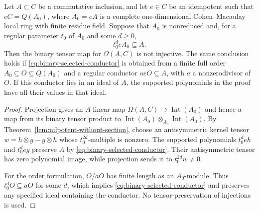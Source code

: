 \begin{lemma}
\label{lem:binary-selected-factor-transfer}
Let $A\subset C$ be a commutative inclusion, and let $e\in C$
be an idempotent such that $eC=Q(A_0)$, where $A_0=eA$ is a
complete one-dimensional Cohen--Macaulay local ring with finite
residue field.  Suppose that $A_0$ is nonreduced and, for a
regular parameter $t_0$ of $A_0$ and some $d\ge0$,
\begin{equation}\label{eq:binary-selected-conductor}
 t_0^deA_0\subseteq A.                                   
\end{equation}
Then the binary tensor map for $\Omega(A,C)$ is not injective.
The same conclusion holds if \eqref{eq:binary-selected-conductor} is obtained from a finite full
order $A_0\subseteq O\subseteq Q(A_0)$ and a regular conductor
$a eO\subseteq A$, with $a$ a nonzerodivisor of $O$.
If this conductor lies in an ideal of $A$, the supported
polynomials in the proof have all their values in that ideal.
\end{lemma}
\begin{proof}
Projection gives an $A$-linear map
$\Omega(A,C)\to\operatorname{Int}(A_0)$ and hence a map from its
binary tensor product to
$\operatorname{Int}(A_0)\otimes_{A_0}\operatorname{Int}(A_0)$.
By Theorem~\ref{lem:nilpotent-without-section}, choose an
antisymmetric kernel tensor
$w=h\otimes g-g\otimes h$ whose $t_0^{2d}$-multiple is nonzero.
The supported polynomials $t_0^deh$ and $t_0^deg$ preserve $A$
by \eqref{eq:binary-selected-conductor}.  Their antisymmetric tensor has zero polynomial image,
while projection sends it to $t_0^{2d}w\ne0$.

For the order formulation, $O/aO$ has finite length as an
$A_0$-module.  Thus $t_0^dO\subseteq aO$ for some $d$,
which implies \eqref{eq:binary-selected-conductor} and preserves any specified ideal containing
the conductor.  No tensor-preservation of injections is used.
\end{proof}

